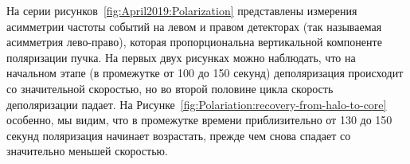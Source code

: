 На серии рисунков~\ref{fig:April2019:Polarization} представлены измерения асимметрии частоты событий на левом и правом детекторах (так называемая асимметрия лево-право), которая пропорциональна вертикальной компоненте поляризации пучка. На первых двух рисунках можно наблюдать, что на начальном этапе (в промежутке от 100 до 150 секунд) деполяризация происходит со значительной скоростью, но во второй половине цикла скорость деполяризации падает. На Рисунке~\ref{fig:Polariation:recovery-from-halo-to-core} особенно, мы видим, что в промежутке времени приблизительно от 130 до 150 секунд поляризация начинает возрастать, прежде чем снова спадает со значительно меньшей скоростью.
\begin{figure}[h]\centering
\end{figure}
